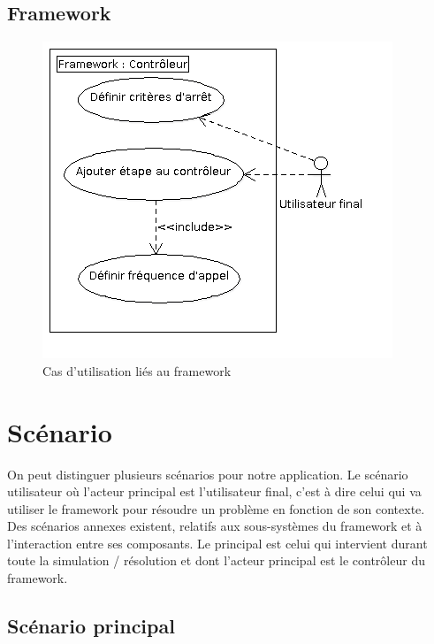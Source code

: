 \subsection{Framework}
\begin{figure}[!h]\centering
   \includegraphics[scale=0.5]{images/uc_framework.png}
   \caption{\label{uc_main} Cas d'utilisation liés au framework}
\end{figure}
%
\section{Scénario}

On peut distinguer plusieurs scénarios pour notre application. Le scénario utilisateur où l'acteur principal est l'utilisateur final, c'est à dire celui qui va utiliser le framework pour résoudre un problème en fonction de son contexte.\\

Des scénarios annexes existent, relatifs aux sous-systèmes du framework et à l’interaction entre ses composants. Le principal est celui qui intervient durant toute la simulation / résolution et dont l'acteur principal est le contrôleur du framework.

%
\subsection{Scénario principal}

